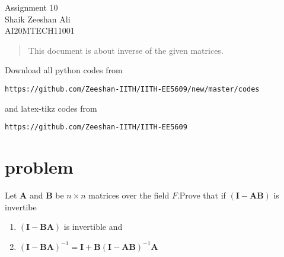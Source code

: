 \documentclass[journal,12pt,twocolumn]{IEEEtran}
\providecommand{\brak}[1]{\ensuremath{\left(#1\right)}}
\numberwithin{equation}{subsection}
\let\vec\mathbf
\begin{document}
\begin{center}
\huge Assignment 10\\

\large Shaik Zeeshan Ali\\
\large AI20MTECH11001\\
\end{center}
\begin{abstract}
This document is about inverse of the given matrices.
\end{abstract}
Download all python codes from 
\begin{lstlisting}
https://github.com/Zeeshan-IITH/IITH-EE5609/new/master/codes
\end{lstlisting}

and latex-tikz codes from 
\begin{lstlisting}
https://github.com/Zeeshan-IITH/IITH-EE5609
\end{lstlisting}
\section{problem}
Let $\vec{A}$ and $\vec{B}$ be $n\times n$ matrices over the field $F$.Prove that if $\brak{\vec{I}-\vec{A}\vec{B}}$ is invertibe
\begin{enumerate}
    \item $\brak{\vec{I}-\vec{B}\vec{A}}$ is invertible and
    \item $\brak{\vec{I}-\vec{B}\vec{A}}^{-1}=\vec{I}+\vec{B}\brak{\vec{I}-\vec{A}\vec{B}}^{-1}\vec{A}$
\end{enumerate}
\end{document}
